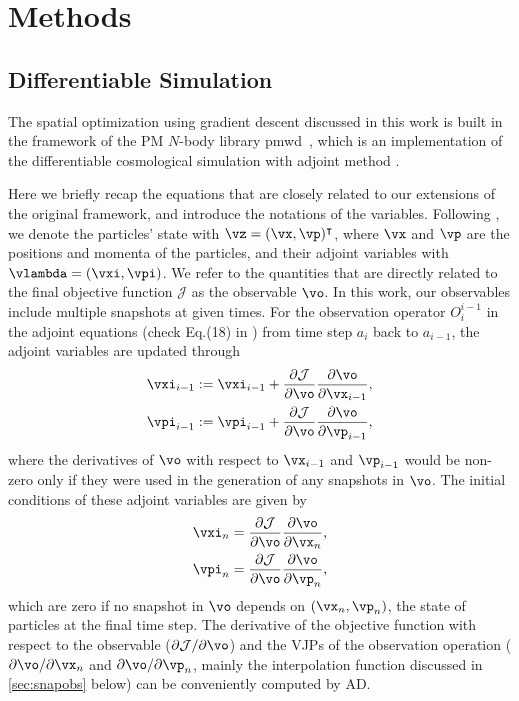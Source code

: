 \documentclass[modern, trackchanges, dvipsnames]{aastex631}
\newcommand{\pmwd}{{\usefont{T1}{nova}{m}{sl}pmwd}}
\newcommand{\p}{\partial}
\newcommand{\cJ}{\mathcal{J}}
\begin{document}
\vspace{1em}
\section{Methods}


\vspace{1em}
\subsection{Differentiable Simulation}
\label{sec:pmwd}

The spatial optimization using gradient descent discussed in this work
is built in the framework of the PM $N$-body library \pmwd\
\citep{Li2022b}, which is an implementation of the differentiable
cosmological simulation with adjoint method \citep{Li2022a}.

Here we briefly recap the equations that are closely related to our
extensions of the original framework, and introduce the notations of the
variables.
Following \cite{Li2022a}, we denote the particles' state with $\vz =
(\vx, \vp)^\intercal$, where $\vx$ and $\vp$ are the positions and
momenta of the particles, and their adjoint variables with $\vlambda =
(\vxi, \vpi)$.
We refer to the quantities that are directly related to the final
objective function $\cJ$ as the observable $\vo$.
In this work, our observables include multiple snapshots at given times.
For the observation operator $O_{i}^{i-1}$ in the adjoint equations
(check Eq.(18) in \cite{Li2022a}) from time step $a_i$ back to
$a_{i-1}$, the adjoint variables are updated through
\begin{align}
  \vxi_{i-1} &:= \vxi_{i-1} + \frac{\p\cJ}{\p\vo}\frac{\p\vo}{\p \vx_{i-1}}, \nonumber\\
  \vpi_{i-1} &:= \vpi_{i-1} + \frac{\p\cJ}{\p\vo}\frac{\p\vo}{\p \vp_{i-1}},
\end{align}
where the derivatives of $\vo$ with respect to $\vx_{i-1}$ and $\vp_{i-1}$ would
be non-zero only if they were used in the generation of any snapshots in $\vo$.
The initial conditions of these adjoint variables are given by
\begin{align}
  \vxi_n &= \frac{\p\cJ}{\p\vo}\frac{\p\vo}{\p\vx_n}, \nonumber\\
  \vpi_n &= \frac{\p\cJ}{\p\vo}\frac{\p\vo}{\p\vp_n},
\end{align}
which are zero if no snapshot in $\vo$ depends on $(\vx_n, \vp_n)$, the
state of particles at the final time step.
The derivative of the objective function with respect to the observable
($\p\cJ/\p\vo$) and the VJPs of the observation operation
($\p\vo/\p\vx_n$ and $\p\vo/\p\vp_n$, mainly the interpolation function
discussed in \autoref{sec:snapobs} below) can be conveniently computed
by AD.
\end{document}
